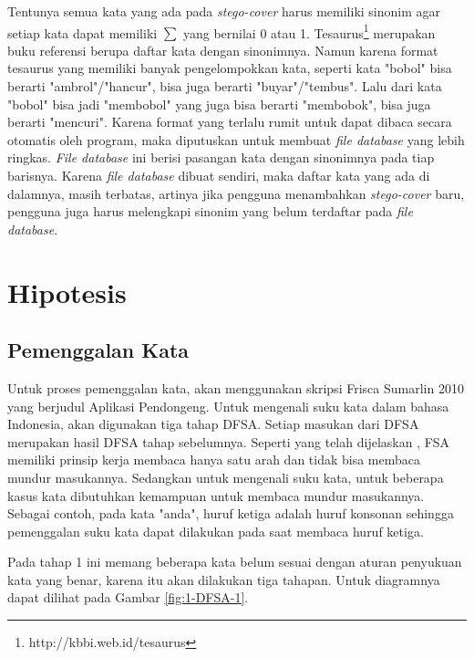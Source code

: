 Tentunya semua kata yang ada pada \textit{stego-cover} harus memiliki sinonim agar setiap kata dapat memiliki $\sum$ yang bernilai 0 atau 1. Tesaurus\footnote{http://kbbi.web.id/tesaurus} merupakan buku referensi berupa daftar kata dengan sinonimnya. Namun karena format tesaurus yang memiliki banyak pengelompokkan kata, seperti kata "bobol" bisa berarti "ambrol"/"hancur", bisa juga berarti "buyar"/"tembus". Lalu dari kata "bobol" bisa jadi "membobol" yang juga bisa berarti "membobok", bisa juga berarti "mencuri". Karena format yang terlalu rumit untuk dapat dibaca secara otomatis oleh program, maka diputuskan untuk membuat \textit{file database} yang lebih ringkas. \textit{File database} ini berisi pasangan kata dengan sinonimnya pada tiap barisnya. Karena \textit{file database} dibuat sendiri, maka daftar kata yang ada di dalamnya, masih terbatas, artinya jika pengguna menambahkan \textit{stego-cover} baru, pengguna juga harus melengkapi sinonim yang belum terdaftar pada \textit{file database}.

\section{Hipotesis}

\subsection{Pemenggalan Kata}
Untuk proses pemenggalan kata, akan menggunakan skripsi Frisca Sumarlin 2010 yang berjudul Aplikasi Pendongeng. Untuk mengenali suku kata dalam bahasa Indonesia, akan digunakan tiga tahap DFSA. Setiap masukan dari DFSA merupakan hasil DFSA tahap sebelumnya. Seperti yang telah dijelaskan , FSA memiliki prinsip kerja membaca hanya satu arah dan tidak bisa membaca mundur masukannya. Sedangkan untuk mengenali suku kata, untuk beberapa kasus kata dibutuhkan kemampuan untuk membaca mundur masukannya. Sebagai contoh, pada kata "anda", huruf ketiga adalah huruf konsonan sehingga pemenggalan suku kata dapat dilakukan pada saat membaca huruf ketiga.

Pada tahap 1 ini memang beberapa kata belum sesuai dengan aturan penyukuan kata yang benar, karena itu akan dilakukan tiga tahapan. Untuk diagramnya dapat dilihat pada Gambar \ref{fig:1-DFSA-1}.

